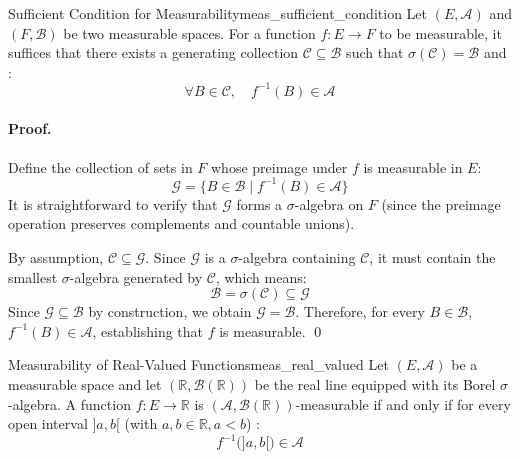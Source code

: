 \vspace{1.2em}


\begin{proposition}{Sufficient Condition for Measurability}{meas_sufficient_condition}
Let $(E, \mathcal{A})$ and $(F, \mathcal{B})$ be two measurable spaces. For a function $f : E \to F$ to be measurable, it suffices that there exists a generating collection $\mathcal{C} \subseteq \mathcal{B}$ such that $\sigma(\mathcal{C}) = \mathcal{B}$ and :
\[
    \forall B \in \mathcal{C}, \quad f^{-1}(B) \in \mathcal{A}
\]
\end{proposition}

\paragraph{Proof.}
Define the collection of sets in $F$ whose preimage under $f$ is measurable in $E$:
\[
    \mathcal{G} = \{ B \in \mathcal{B} \mid f^{-1}(B) \in \mathcal{A} \}
\]
It is straightforward to verify that $\mathcal{G}$ forms a $\sigma$-algebra on $F$ (since the preimage operation preserves complements and countable unions).

By assumption, $\mathcal{C} \subseteq \mathcal{G}$. Since $\mathcal{G}$ is a $\sigma$-algebra containing $\mathcal{C}$, it must contain the smallest $\sigma$-algebra generated by $\mathcal{C}$, which means:
\[
    \mathcal{B} = \sigma(\mathcal{C}) \subseteq \mathcal{G}
\]
Since $\mathcal{G} \subseteq \mathcal{B}$ by construction, we obtain $\mathcal{G} = \mathcal{B}$. Therefore, for every $B \in \mathcal{B}$, $f^{-1}(B) \in \mathcal{A}$, establishing that $f$ is measurable. \qed


\begin{example}{Measurability of Real-Valued Functions}{meas_real_valued}
Let $(E, \mathcal{A})$ be a measurable space and let $(\mathbb{R}, \mathcal{B}(\mathbb{R}))$ be the real line equipped with its Borel $\sigma$-algebra. A function $f : E \to \mathbb{R}$ is $(\mathcal{A}, \mathcal{B}(\mathbb{R}))$-measurable if and only if for every open interval $]a, b[$ (with $a, b \in \mathbb{R}, a < b$) :
\[
    f^{-1}\big(]a, b[\big) \in \mathcal{A}
\]
\end{example}

